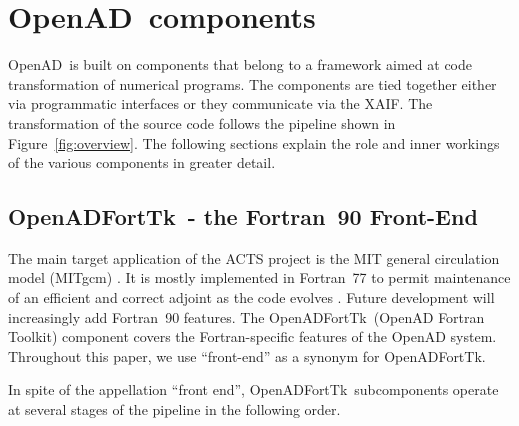 \documentclass[acmtocl,acmnow]{acmtrans2m}
\newcommand{\OpenAD}{OpenAD}
\newcommand{\OpenADFortTk}{OpenADFortTk}
\newcommand{\xaif}{XAIF}
\newcommand{\reffig}[1]{Figure~\ref{#1}}
\begin{document}
\section{\OpenAD\ components}
\OpenAD\  is built on components that belong to a framework aimed at 
code transformation of numerical programs. 
The components are tied together either via programmatic interfaces or they 
communicate via the \xaif. The transformation of the source code follows the 
pipeline shown in \reffig{fig:overview}. 
The following sections explain the role and inner workings of the various 
components in greater detail. 

\subsection{\OpenADFortTk\ - the Fortran~90 Front-End}

The main target application of the ACTS project is the MIT general
circulation model (MITgcm) \cite{mars-eta:97b,mars-eta:97a}.
It is mostly implemented in Fortran~77 to permit maintenance of an
efficient and correct adjoint as the code evolves \cite{HHG02}. Future
development will increasingly add Fortran~90 features.  The
\OpenADFortTk\ (OpenAD Fortran Toolkit) 
component covers the
Fortran-specific features of the OpenAD system. Throughout this
paper, we use ``front-end'' as a synonym for \OpenADFortTk.

In spite of the appellation ``front end'', \OpenADFortTk\ subcomponents
operate at several stages of the pipeline in the following order.
	
\end{document}
